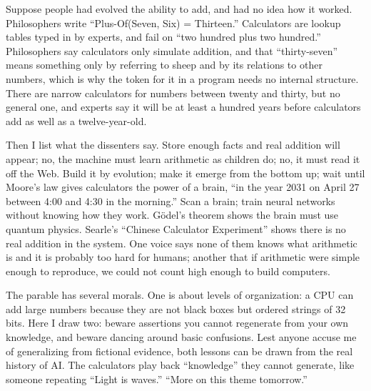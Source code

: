 
Suppose people had evolved the ability to add, and had no idea how it worked. Philosophers write ``Plus-Of(Seven, Six) = Thirteen.'' Calculators are lookup tables typed in by experts, and fail on ``two hundred plus two hundred.'' Philosophers say calculators only simulate addition, and that ``thirty-seven'' means something only by referring to sheep and by its relations to other numbers, which is why the token for it in a program needs no internal structure. There are narrow calculators for numbers between twenty and thirty, but no general one, and experts say it will be at least a hundred years before calculators add as well as a twelve-year-old.

Then I list what the dissenters say. Store enough facts and real addition will appear; no, the machine must learn arithmetic as children do; no, it must read it off the Web. Build it by evolution; make it emerge from the bottom up; wait until Moore's law gives calculators the power of a brain, ``in the year 2031 on April 27 between 4:00 and 4:30 in the morning.'' Scan a brain; train neural networks without knowing how they work. G\"odel's theorem shows the brain must use quantum physics. Searle's ``Chinese Calculator Experiment'' shows there is no real addition in the system. One voice says none of them knows what arithmetic is and it is probably too hard for humans; another that if arithmetic were simple enough to reproduce, we could not count high enough to build computers. 

The parable has several morals. One is about levels of organization: a CPU can add large numbers because they are not black boxes but ordered strings of 32 bits. Here I draw two: beware assertions you cannot regenerate from your own knowledge, and beware dancing around basic confusions. Lest anyone accuse me of generalizing from fictional evidence, both lessons can be drawn from the real history of AI.  The calculators play back ``knowledge'' they cannot generate, like someone repeating ``Light is waves.'' ``More on this theme tomorrow.'' 

